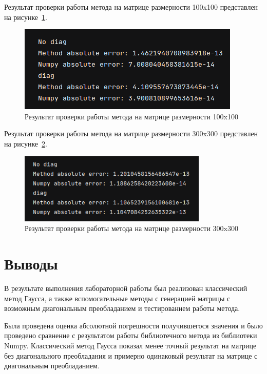 \documentclass[a4paper, 14pt]{extarticle}
\begin{document}
Результат проверки работы метода на матрице размерности 100x100 представлен на рисунке~\ref{fig:img2}.


\begin{figure}[H]
\centering
\includegraphics{images/res2.png}
\caption{Результат проверки работы метода на матрице размерности 100x100}
\label{fig:img2}
\end{figure}


Результат проверки работы метода на матрице размерности 300x300 представлен на рисунке~\ref{fig:img3}.

\begin{figure}[H]
\centering
\includegraphics[width=0.8\textwidth]{images/res3.png}
\caption{Результат проверки работы метода на матрице размерности 300x300}
\label{fig:img3}
\end{figure}


\section{Выводы}
В результате выполнения лабораторной работы был реализован классический метод Гаусса, а также вспомогательные методы с генерацией матрицы с возможным диагональным преобладанием и тестированием работы метода.

Была проведена оценка абсолютной погрешности получившегося значения и было проведено сравнение с результатом работы библиотечного метода из библиотеки Numpy. Классический метод Гаусса показал менее точный результат на матрице без диагонального преобладания и примерно одинаковый результат на матрице с диагональным преобладанием.
\end{document}
